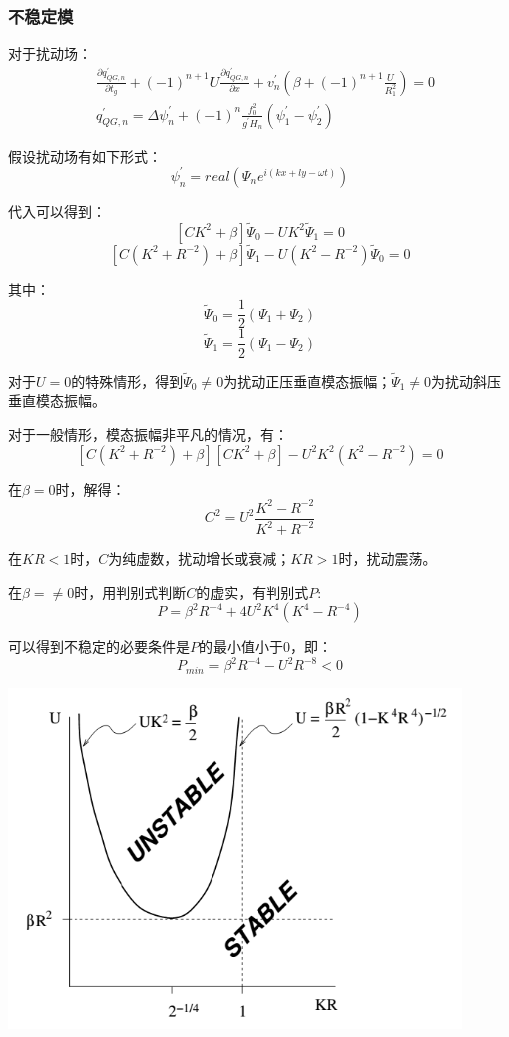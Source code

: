 \documentclass{article}
\begin{document}
\subsubsection{不稳定模}
对于扰动场：
\begin{align}
    &\frac{\partial q^{\prime}_{QG,n}}{\partial t_g} + (-1)^{n+1}U\frac{\partial q^{\prime}_{QG,n}}{\partial x} + v^{\prime}_n\left(\beta + (-1)^{n+1}\frac{U}{R_1^2}\right)= 0\\
    &q^{\prime}_{QG,n} = \Delta \psi^{\prime}_n + (-1)^{n}\frac{f_0^2}{g^{\prime}H_n}(\psi_1^{\prime} - \psi_2^{\prime})
\end{align}

假设扰动场有如下形式：
$$\psi^{\prime}_n = real(\Psi_ne^{i(kx+ly-\omega t)})$$

代入可以得到：
$$[CK^2 +\beta]\tilde{\Psi}_0-UK^2\tilde{\Psi}_1 = 0$$
$$[C(K^2+R^{-2}) +\beta]\tilde{\Psi}_1-U(K^2-R^{-2})\tilde{\Psi}_0 = 0$$

其中：
$$\tilde{\Psi}_0 = \frac{1}{2}(\Psi_1 +\Psi_2)$$
$$\tilde{\Psi}_1 = \frac{1}{2}(\Psi_1 -\Psi_2)$$

对于$U=0$的特殊情形，得到$\tilde{\Psi}_0\ne0$为扰动正压垂直模态振幅；$\tilde{\Psi}_1\ne0$为扰动斜压垂直模态振幅。

对于一般情形，模态振幅非平凡的情况，有：
$$[C(K^2+R^{-2}) +\beta][CK^2 +\beta]-U^2K^2(K^2-R^{-2}) = 0$$

在$\beta=0$时，解得：
$$C^2 = U^2\frac{K^2-R^{-2}}{K^2+R^{-2}}$$

在$KR<1$时，$C$为纯虚数，扰动增长或衰减；$KR>1$时，扰动震荡。

在$\beta=\ne0$时，用判别式判断$C$的虚实，有判别式$P$:
$$P=\beta^2R^{-4}+4U^2K^4(K^4-R^{-4})$$

可以得到不稳定的必要条件是$P$的最小值小于$0$，即：
$$P_{min}=\beta^2R^{-4}-U^2R^{-8}<0$$

\begin{center}
    \includegraphics[width=12cm]{Fig4_3.png}
\end{center}
\end{document}
